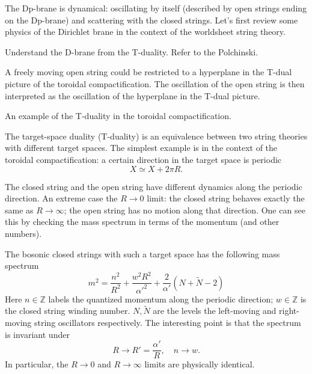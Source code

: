 

The Dp-brane is dynamical: oscillating by itself 
(described by open strings ending on the Dp-brane)
and scattering with the closed strings.
Let's first review some physics of the Dirichlet brane
in the context of the worldsheet string theory.

\begin{problem}
Understand the D-brane from the T-duality. Refer to the Polchinski.
\end{problem}

A freely moving open string could be restricted to a hyperplane in the T-dual picture of the toroidal compactification.
The oscillation of the open string is then interpreted as the oscillation of the hyperplane in the T-dual picture.

\begin{problem}
An example of the T-duality in the toroidal compactification.	
\end{problem}

The target-space duality (T-duality) is an equivalence between
two string theories with different target spaces.
The simplest example is in the context of the toroidal compactification:
a certain direction in the target space is periodic
\[
X \simeq X + 2\pi R
.\] 

The closed string and the open string have different dynamics along the periodic direction.
An extreme case the $R\to 0$ limit:
the closed string behaves exactly the same as $R\to\infty$;
the open string has no motion along that direction.
One can see this by checking the mass spectrum
in terms of the momentum (and other numbers).

The bosonic closed strings with such a target space has the following mass spectrum
\begin{equation}
	m^2 = \frac{n^2}{R^2} + \frac{w^2 R^2}{\alpha'^2}
	+ \frac{2}{\alpha'} (N + \tilde{N} - 2)
\end{equation}
Here $n \in \mathbb{Z}$ labels the quantized momentum along the periodic direction; 
$w \in \mathbb{Z}$ is the closed string winding number.
$N,\tilde{N}$ are the levels the left-moving and right-moving string oscillators respectively.
The interesting point is that the spectrum is invariant under
\[
R \to R' = \frac{\alpha'}{R},\quad
n \to w
.\] 
In particular, the $R\to 0$ and $R\to\infty$ limits are physically identical.

